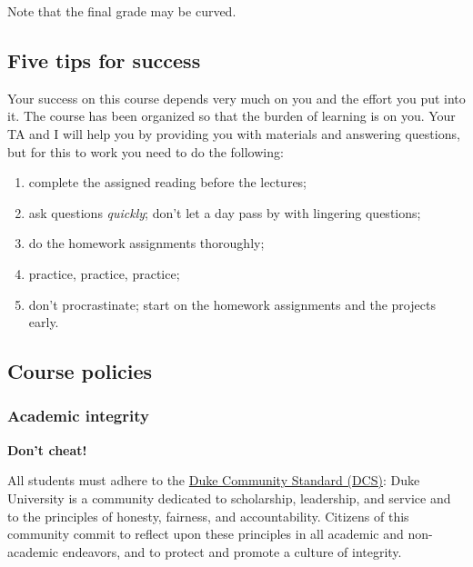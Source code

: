 \documentclass[
  letterpaper,
  DIV=11,
  numbers=noendperiod]{scrartcl}
\providecommand{\tightlist}{%
  \setlength{\itemsep}{0pt}\setlength{\parskip}{0pt}}
\begin{document}
Note that the final grade may be curved.

\hypertarget{five-tips-for-success}{%
\subsection{Five tips for success}\label{five-tips-for-success}}

Your success on this course depends very much on you and the effort you
put into it. The course has been organized so that the burden of
learning is on you. Your TA and I will help you by providing you with
materials and answering questions, but for this to work you need to do
the following:

\begin{enumerate}
\def\labelenumi{\arabic{enumi}.}
\tightlist
\item
  complete the assigned reading before the lectures;
\item
  ask questions \emph{quickly}; don't let a day pass by with lingering
  questions;
\item
  do the homework assignments thoroughly;
\item
  practice, practice, practice;
\item
  don't procrastinate; start on the homework assignments and the
  projects early.
\end{enumerate}

\hypertarget{course-policies}{%
\subsection{Course policies}\label{course-policies}}

\hypertarget{academic-integrity}{%
\subsubsection{Academic integrity}\label{academic-integrity}}

\textbf{Don't cheat!}

All students must adhere to the
\href{https://trinity.duke.edu/undergraduate/academic-policies/community-standard-student-conduct}{Duke
Community Standard (DCS)}: Duke University is a community dedicated to
scholarship, leadership, and service and to the principles of honesty,
fairness, and accountability. Citizens of this community commit to
reflect upon these principles in all academic and non-academic
endeavors, and to protect and promote a culture of integrity.
\end{document}
